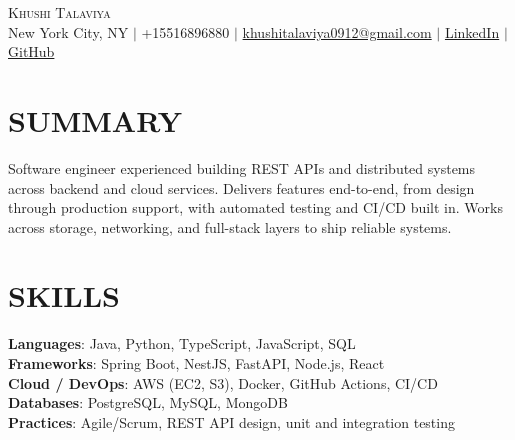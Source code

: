 \documentclass[letterpaper,11pt]{article}
\begin{document}
\begin{center}
    {\Huge \scshape Khushi Talaviya} \\ \vspace{2pt}
    \vspace{4pt}
    \small
    New York City, NY $|$
    \small
    +15516896880 $|$
    \href{mailto:khushitalaviya0912@gmail.com}{khushitalaviya0912@gmail.com} $|$
    \href{https://www.linkedin.com/in/khushitalaviya/}{LinkedIn} $|$
    \href{https://github.com/talaviyakhushi}{GitHub}
\end{center}

\section{SUMMARY}
\vspace{5pt}
\small{Software engineer experienced building REST APIs and distributed systems across backend and cloud services. Delivers features end-to-end, from design through production support, with automated testing and CI/CD built in. Works across storage, networking, and full-stack layers to ship reliable systems.}

\vspace{2pt}
\section{SKILLS}
\vspace{5pt}
\begin{itemize}[leftmargin=0in, label={}]
\small{\item{
\textbf{Languages}{: Java, Python, TypeScript, JavaScript, SQL} \\
\textbf{Frameworks}{: Spring Boot, NestJS, FastAPI, Node.js, React} \\
\textbf{Cloud / DevOps}{: AWS (EC2, S3), Docker, GitHub Actions, CI/CD} \\
\textbf{Databases}{: PostgreSQL, MySQL, MongoDB} \\
\textbf{Practices}{: Agile/Scrum, REST API design, unit and integration testing}
}}
\end{itemize}
\vspace{-10pt}

\end{document}

